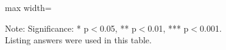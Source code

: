 \documentclass[11pt,harvard]{article}
\begin{document}
	\begin{table}[htbp]
	\centering
	\begin{adjustbox}{max width=\textwidth}
		\begin{threeparttable}
			\caption{CAR Sample Balance Table}
			\scriptsize
			 
			\label{tab:CAR_Modality_Own_Phone_Demo_Balance}
			\begin{tablenotes}
				\item Note: Significance: * p$<$0.05, ** p$<$0.01, *** p$<$0.001. \\
						 Listing answers were used in this table.
			\end{tablenotes}
		\end{threeparttable}
	\end{adjustbox}
\end{table}
\end{document}
